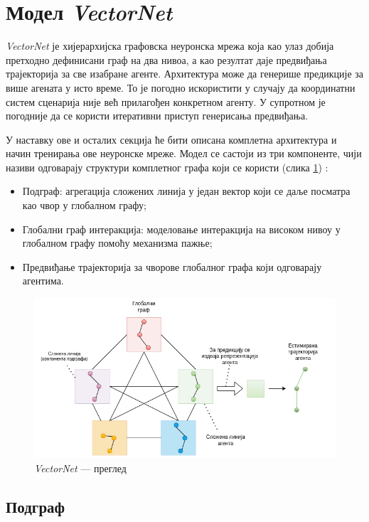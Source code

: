 \documentclass[11pt,oneside]{memoir}
\begin{document}
\section{Модел \textit{VectorNet}}

\textit{VectorNet} је хијерархијска графовска неуронска мрежа која као улаз добија претходно дефинисани граф на два нивоа, а као резултат
даје предвиђања трајекторија за све изабране агенте. Архитектура може да генерише предикције за више агената у исто време. То
је погодно искористити у случају да координатни систем сценарија није већ прилагођен конкретном агенту. У супротном је погодније
да се користи итеративни приступ генерисања предвиђања.

У наставку ове и осталих секција ће бити описана комплетна архитектура и начин тренирања ове неуронске мреже. Модел се састоји из три компоненте,
чији називи одговарају структури комплетног графа који се користи (слика \ref{vectornet-overview}) \cite{vectornet}:
\begin{itemize}
  \item Подграф: агрегација сложених линија у један вектор који се даље посматра као чвор у глобалном графу;
  \item Глобални граф интеракција: моделовање интеракција на високом нивоу у глобалном графу помоћу механизма пажње;
  \item Предвиђање трајекторија за чворове глобалног графа који одговарају агентима.
\end{itemize}

\begin{figure}[H]
  \centering
  \includegraphics[width=1.0\textwidth]{images/vectornet-overview-Hijearhija.drawio.png}
  \caption{\textit{VectorNet} --- преглед \label{vectornet-overview}}
\end{figure}

\subsection{Подграф}
\end{document}
